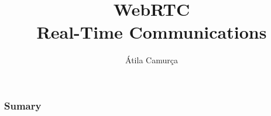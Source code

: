 \documentclass[10pt]{beamer}
\title{WebRTC\\Real-Time Communications}
\author{Átila Camurça}
\begin{document}
\begin{frame}
\titlepage
\end{frame}

\begin{frame}\frametitle{Sumary}
\tableofcontents
\end{frame}


\end{document}
